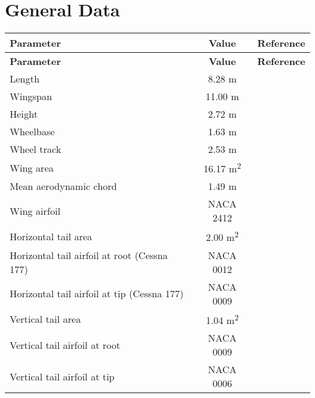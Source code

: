 \section{General Data}

\begin{tabularx}{\textwidth}{ | L | c | c | }
  \hline
  \textbf{Parameter}                    & \textbf{Value}   & \textbf{Reference} \\ \hline
  \endfirsthead
  \hline
  \textbf{Parameter}                    & \textbf{Value}   & \textbf{Reference} \\ \hline
  \endhead
  Length                                & 8.28 m           & \cite{Cessna172_InformationManual,Janes20042005} \\ \hline
  Wingspan                              & 11.00 m          & \cite{Cessna172_InformationManual,Janes20042005} \\ \hline
  Height                                & 2.72 m           & \cite{Cessna172_InformationManual,Janes20042005} \\ \hline
  Wheelbase                             & 1.63 m           & \cite{Janes20042005} \\ \hline
  Wheel track                           & 2.53 m           & \cite{Janes20042005} \\ \hline
  Wing area                             & 16.17 m\textsuperscript{2} & \cite{Cessna172_InformationManual,Janes20042005} \\ \hline
  Mean aerodynamic chord                & 1.49 m           & \cite{Cessna172_InformationManual} \\ \hline
  Wing airfoil                          & NACA 2412        & \cite{Janes20042005} \\ \hline
  Horizontal tail area                  & 2.00 m\textsuperscript{2} & \cite{Janes20042005} \\ \hline
  Horizontal tail airfoil at root (Cessna 177) & NACA 0012 & \cite{Torenbeek1982} \\ \hline
  Horizontal tail airfoil at tip (Cessna 177)  & NACA 0009 & \cite{Torenbeek1982} \\ \hline
  Vertical tail area                    & 1.04 m\textsuperscript{2} & \cite{Janes20042005} \\ \hline
  Vertical tail airfoil at root         & NACA 0009        & \cite{NASA-CR-158974} \\ \hline
  Vertical tail airfoil at tip          & NACA 0006        & \cite{NASA-CR-158974} \\ \hline

\end{tabularx}
